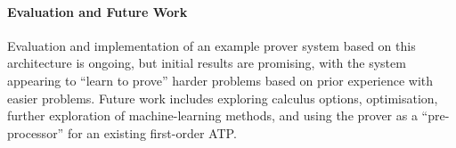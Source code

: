 \documentclass{easychair}
\begin{document}
\paragraph{Evaluation and Future Work}
Evaluation and implementation of an example prover system based on this architecture is ongoing, but initial results are promising, with the system appearing to ``learn to prove'' harder problems based on prior experience with easier problems.
Future work includes exploring calculus options, optimisation, further exploration of machine-learning methods, and using the prover as a ``pre-processor'' for an existing first-order ATP.

\vspace{-1em}



\end{document}
